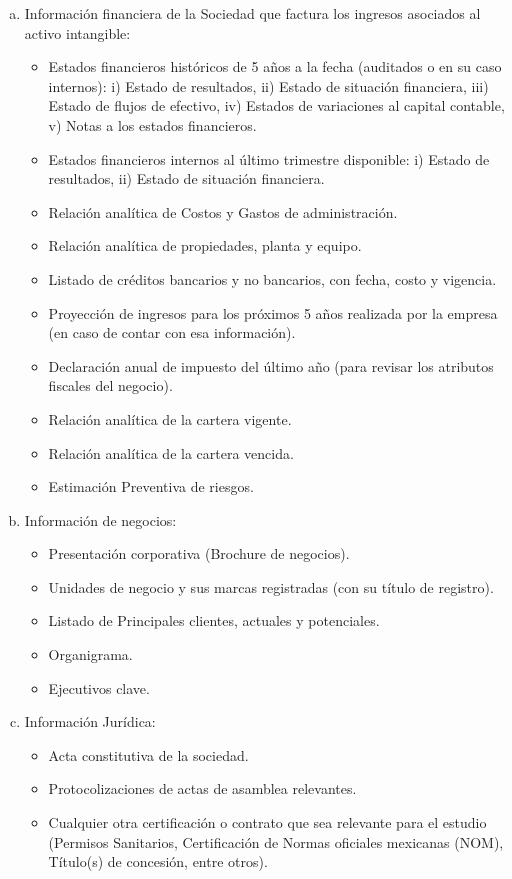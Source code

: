 \documentclass[5pt,letter]{article}
\begin{document}
 \begin{enumerate}[a)]
 \item Información financiera de la Sociedad que factura los ingresos asociados al activo intangible:

 \begin{itemize}
\item Estados financieros históricos de 5 años a la fecha (auditados o en su caso internos): i) Estado de resultados, ii) Estado de situación financiera, iii) Estado de flujos de efectivo, iv) Estados de variaciones al capital contable, v) Notas a los estados financieros.
\item Estados financieros internos al último trimestre disponible: i) Estado de resultados, ii) Estado de situación financiera.
\item Relación analítica de Costos y Gastos de administración.
\item Relación analítica de propiedades, planta y equipo.
\item Listado de créditos bancarios y no bancarios, con fecha, costo y vigencia.
\item Proyección de ingresos para los próximos 5 años realizada por la empresa (en
caso de contar con esa información).
\item Declaración anual de impuesto del último año (para revisar los atributos fiscales
del negocio).
\item Relación analítica de la cartera vigente.
\item Relación analítica de la cartera vencida.
\item Estimación Preventiva de riesgos.

\end{itemize}
\item  Información de negocios:
\begin{itemize}
\item Presentación corporativa (Brochure de negocios).
\item Unidades de negocio y sus marcas registradas (con su título de registro).
\item Listado de Principales clientes, actuales y potenciales.
\item Organigrama.
\item Ejecutivos clave.
\end{itemize}
\item Información Jurídica:
\begin{itemize}
\item Acta constitutiva de la sociedad.
\item Protocolizaciones de actas de asamblea relevantes.
\item Cualquier otra certificación o contrato que sea relevante para el estudio (Permisos
Sanitarios, Certificación de Normas oficiales mexicanas (NOM), Título(s) de concesión, entre otros).
\end{itemize}


\end{enumerate}
\end{document}
